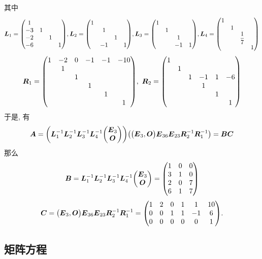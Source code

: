 \begin{solution}
\begin{enumerate}[label=(\arabic{*})]
              其中 $$\vb*{L}_1=\mqty(1\\-3&1\\-2&&1\\-6&&&1),\vb*{L}_2=\mqty(1\\&1\\&&1\\&-1&&1),\vb*{L}_3=\mqty(1\\&1\\&&1\\&&-1&1),\vb*{L}_4=\mqty(1\\&1\\&&\dfrac{1}{7}\\&&&1)$$
              $$\vb*{R}_1=\mqty(1&-2&0&-1&-1&-10\\&1\\&&1\\&&&1\\&&&&1\\&&&&&1),~\vb*{R}_2=\mqty(1\\&1\\&&1&-1&1&-6\\&&&1\\&&&&1\\&&&&&1)$$
              于是, 有 $$\vb*{A}=\qty(\vb*{L}_1^{-1}\vb*{L}_2^{-1}\vb*{L}_3^{-1}\vb*{L}_4^{-1}\mqty(\vb*{E}_3\\\vb*{O}))\qty(\mqty(\vb*{E}_3,\vb*{O})\vb*{E}_{36}\vb*{E}_{23}\vb*{R}_2^{-1}\vb*{R}_1^{-1})=\vb*{BC}$$
              那么 $$\vb*{B}=\vb*{L}_1^{-1}\vb*{L}_2^{-1}\vb*{L}_3^{-1}\vb*{L}_4^{-1}\mqty(\vb*{E}_3\\\vb*{O})=\mqty(1&0&0\\3&1&0\\2&0&7\\6&1&7)$$
              $$\vb*{C}=\mqty(\vb*{E}_3,\vb*{O})\vb*{E}_{36}\vb*{E}_{23}\vb*{R}_2^{-1}\vb*{R}_1^{-1}=\mqty(1&2&0&1&1&10\\0&0&1&1&-1&6\\0&0&0&0&0&1).$$
    \end{enumerate}
\end{solution}

\subsection{矩阵方程}

